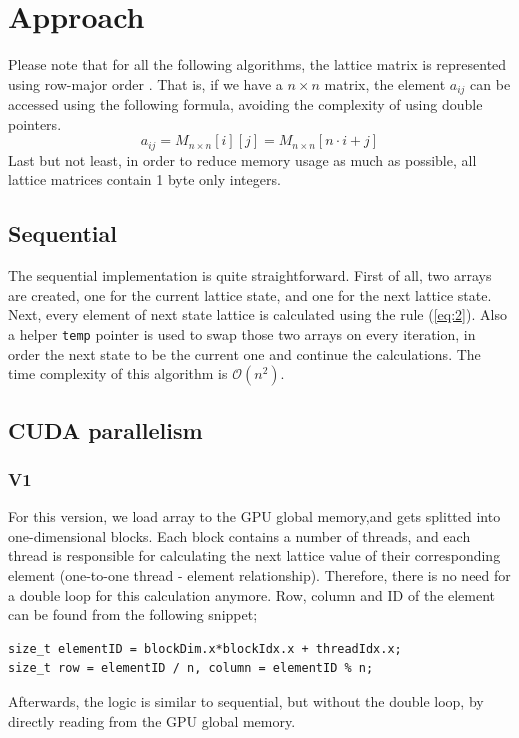 \documentclass[11pt]{article}
\begin{document}
\section{Approach}
\label{sec:orgf701648}
Please note that for all the following algorithms, the lattice matrix is represented using row-major order \autocite{enwiki:1161536790}. That is, if we have a \(n \times n\) matrix, the element \(a_{ij}\) can be accessed using the following formula, avoiding the complexity of using double pointers.
\begin{equation}
\label{eq:1}
a_{ij} =  M_{n \times n}[i][j] = M_{n \times n}[n \cdot i + j]
\end{equation}
Last but not least, in order to reduce memory usage as much as possible, all lattice matrices contain 1 byte only integers.
\subsection{Sequential}
\label{sec:orgc995e3a}
The sequential implementation is quite straightforward. First of all, two arrays are created, one for the current lattice state, and one for the next lattice state. Next, every element of next state lattice is calculated using the rule (\ref{eq:2}). Also a helper \texttt{temp} pointer is used to swap those two arrays on every iteration, in order the next state to be the current one and continue the calculations. The time complexity of this algorithm is \(\mathcal{O}(n^{2})\).
\subsection{CUDA parallelism}
\label{sec:org95ea536}
\subsubsection{V1}
\label{sec:orgb83034f}
For this version, we load array to the GPU global memory,and gets splitted into one-dimensional blocks. Each block contains a number of threads, and each thread is responsible for calculating the next lattice value of their corresponding element (one-to-one thread - element relationship). Therefore, there is no need for a double loop for this calculation anymore. Row, column and ID of the element can be found from the following snippet;
\begin{verbatim}
size_t elementID = blockDim.x*blockIdx.x + threadIdx.x;
size_t row = elementID / n, column = elementID % n;
\end{verbatim}
Afterwards, the logic is similar to sequential, but without the double loop, by directly reading from the GPU global memory.
\end{document}
